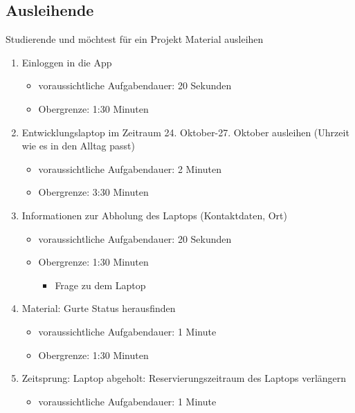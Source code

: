 \subsection{Ausleihende}

{\sffamily\color{maincolor}{Szenario:}} Studierende und möchtest für ein Projekt Material ausleihen
\begin{enumerate}
    \item Einloggen in die App
            \begin{itemize}
                \item voraussichtliche Aufgabendauer: 20 Sekunden
                \item Obergrenze: 1:30 Minuten
            \end{itemize}
    \item Entwicklungslaptop im Zeitraum 24. Oktober-27. Oktober ausleihen (Uhrzeit wie es in den Alltag passt)
            \begin{itemize}
                \item voraussichtliche Aufgabendauer: 2 Minuten
                \item Obergrenze: 3:30 Minuten
            \end{itemize}
    \item Informationen zur Abholung des Laptops (Kontaktdaten, Ort)
            \begin{itemize}
                \item voraussichtliche Aufgabendauer: 20 Sekunden
                \item Obergrenze: 1:30 Minuten
                \begin{itemize}
                    \item Frage zu dem Laptop
                \end{itemize}
            \end{itemize}
    \item Material: Gurte Status herausfinden
            \begin{itemize}
                \item voraussichtliche Aufgabendauer: 1 Minute
                \item Obergrenze: 1:30 Minuten
            \end{itemize}
    \item Zeitsprung: Laptop abgeholt: Reservierungszeitraum des Laptops verlängern
            \begin{itemize}
                \item voraussichtliche Aufgabendauer: 1 Minute

\end{itemize}
\end{enumerate}
